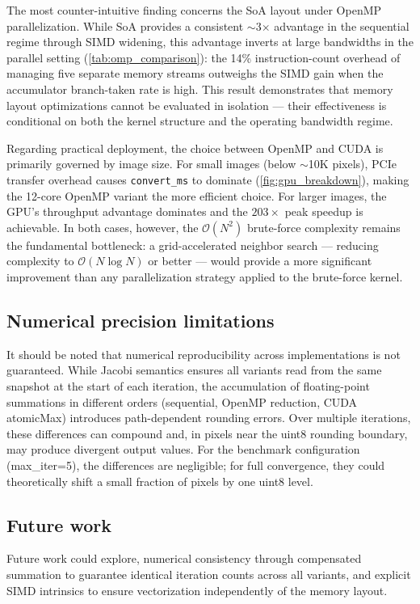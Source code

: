 \documentclass[10pt,twocolumn,letterpaper]{article}
\begin{document}
The most counter-intuitive finding concerns the SoA layout under OpenMP 
parallelization. While SoA provides a consistent $\sim$3$\times$ advantage in 
the sequential regime through SIMD widening, this advantage inverts at large 
bandwidths in the parallel setting (\cref{tab:omp_comparison}): the 14\% 
instruction-count overhead of managing five separate memory streams outweighs 
the SIMD gain when the accumulator branch-taken rate is high. This result 
demonstrates that memory layout optimizations cannot be evaluated in isolation 
— their effectiveness is conditional on both the kernel structure and the 
operating bandwidth regime.

Regarding practical deployment, the choice between OpenMP and CUDA is 
primarily governed by image size. For small images (below $\sim$10K pixels), 
PCIe transfer overhead causes \texttt{convert\_ms} to dominate 
(\cref{fig:gpu_breakdown}), making the 12-core OpenMP variant the more 
efficient choice. For larger images, the GPU's throughput advantage dominates 
and the $203\times$ peak speedup is achievable. In both cases, however, the 
$\mathcal{O}(N^2)$ brute-force complexity remains the fundamental bottleneck: 
a grid-accelerated neighbor search — reducing complexity to 
$\mathcal{O}(N \log N)$ or better — would provide a more significant 
improvement than any parallelization strategy applied to the brute-force kernel.

\subsection{Numerical precision limitations}\label{subsec:numerical}
It should be noted that numerical reproducibility across implementations is not guaranteed. While Jacobi semantics ensures all variants read from the same snapshot at the start of each iteration, the accumulation of floating-point summations in different orders (sequential, OpenMP reduction, CUDA atomicMax) introduces path-dependent rounding errors. Over multiple iterations, these differences can compound and, in pixels near the uint8 rounding boundary, may produce divergent output values. For the benchmark configuration (max\_iter=5), the differences are negligible; for full convergence, they could theoretically shift a small fraction of pixels by one uint8 level.

\subsection{Future work}
Future work could explore, numerical consistency through compensated summation to guarantee identical iteration counts across all variants, and explicit SIMD intrinsics to ensure vectorization independently of the memory layout.
\end{document}
